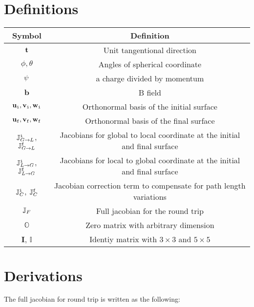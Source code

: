 \documentclass[12pt,a4paper]{scrarticle}
\begin{document}
\newcommand{\bfield}{\mathbf{b}}
\newcommand{\zeroMatrix}{\mathbb{O}}
\newcommand{\IdentityMatrixFive}{\mathbb{I}}
\newcommand{\IdentityMatrixThree}{\mathbf{I}}

\section{Definitions}

\begin{center}
\begin{tabular}{||c c ||} 
 \hline
 Symbol & Definition  \\ [0.5ex] 
 \hline\hline
 $\mathbf{t}$ & Unit tangentional direction \\
 \hline
 $\phi, \theta$ & Angles of spherical coordinate \\
 \hline
 $\psi$ & a charge divided by momentum \\
 \hline
 $\bfield$ & B field \\
 \hline 
 $\mathbf{u}_\texttt{i}, \mathbf{v}_\texttt{i}, \mathbf{w}_\texttt{i}$ & Orthonormal basis of the initial surface  \\ 
 \hline
 $\mathbf{u}_\texttt{f}, \mathbf{v}_\texttt{f}, \mathbf{w}_\texttt{f}$ & Orthonormal basis of the final surface  \\ 
 \hline 
 $\mathbb{J}_{G \rightarrow L}^{\texttt{i}}$, $\mathbb{J}_{G \rightarrow L}^{\texttt{f}}$ & Jacobians for global to local coordinate at the initial and final surface  \\
 \hline
  $\mathbb{J}_{L \rightarrow G}^{\texttt{i}}$, $\mathbb{J}_{L \rightarrow G}^{\texttt{f}}$ &  Jacobians for local to global coordinate at the initial and final surface \\
 \hline
  $\mathbb{J}_{C}^{\texttt{i}}$, $\mathbb{J}_{C}^{\texttt{f}}$ &  Jacobian correction term to compensate for path length variations  \\ 
 \hline
 $\mathbb{J}_{F}$ & Full jacobian for the round trip \\
 \hline
 $\zeroMatrix$ & Zero matrix with arbitrary dimension \\
 \hline
 $\IdentityMatrixThree$, $\IdentityMatrixFive$  &  Identiy matrix with $3\times3$ and $5\times5$\\
 \hline
\end{tabular}
\end{center}

\section{Derivations}

The full jacobian for round trip is written as the following:
\end{document}
